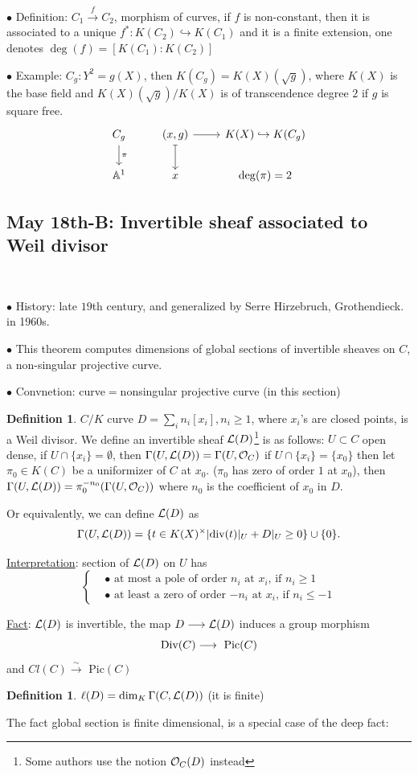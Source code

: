 \documentclass[11pt]{article}
\theoremstyle{definition}
\newtheorem{dfn}[thm]{Definition}
\newcommand{\pic}{\text{ Pic}}
\newcommand{\affn}{\mathbb A}
\newcommand{\call}{{\cal L}}
\newcommand{\calo}{{\cal O}}
\renewcommand{\div}{\textnormal{div}}
\newcommand{\Div}{\textnormal{Div}}
\newcommand{\lrta}{\longrightarrow}
\newcommand{\inj}{\hookrightarrow}
\begin{document}
$\bullet$ Definition: $C_1\overset{f}{\lrta}{C_2}$, morphism of curves, if $f$ is non-constant, then it is associated to a unique $f^*:K(C_2)\inj K(C_1)$ and it is a finite extension, one denotes $\deg(f)=[K(C_1):K(C_2)]$

$\bullet$ Example: $C_g:Y^2=g(X)$, then $K(C_g)=K(X)(\sqrt{g})$, where $K(X)$ is the base field and $K(X)(\sqrt{g})/K(X)$ is of transcendence degree $2$ if $g$ is square free.
$$
\begin{tikzcd}
C_g \arrow[d, "\pi"] & {(x,g)} \arrow[d, maps to] \arrow[r] & K(X)\inj K(C_g) \\
\affn^1 & x & \deg(\pi)=2
\end{tikzcd}
$$
\subsection{May 18th-B: Invertible sheaf associated to Weil divisor}
\ 

$\bullet$ History: late $19$th century, and generalized by Serre Hirzebruch, Grothendieck. in 1960s.

$\bullet$ This theorem computes dimensions of global sections of invertible sheaves on $C$, a non-singular projective curve.

$\bullet$ Convnetion: curve$=$nonsingular projective curve (in this section)
\begin{dfn} $C/K$ curve $D=\sum_i n_i [x_i], n_i\geq 1$, where $x_i$'s are closed points,  is a Weil divisor.  We define an  invertible sheaf $\call(D)$\footnote{Some authors use the notion $\calo_C(D)$ instead} is as follows:
$U\subset C$ open dense, if $U\cap \{x_i\}=\emptyset$, then $\Gamma(U,\call(D))=\Gamma(U,\calo_C)$ if $U\cap \{x_i\}=\{x_0\}$ then let $\pi_0\in K(C)$  be a uniformizer of $C$ at $x_0$.  ($\pi_0$ has zero of order $1$ at $x_0$), then $\Gamma(U,\call(D))=\pi_0^{-n_0}(\Gamma(U,\calo_C))$ where $n_0$ is the coefficient of $x_0$ in $D$.

Or equivalently, we can define $\call(D)$ as
$$
\Gamma(U,\call(D))=\{t\in K(X)^\times| \div(t)|_U+D|_U \geq 0\}\cup \{0\}.
$$
\end{dfn}
\underline{Interpretation}: section of $\call(D)$ on $U$ has 
$$
\left\{
\begin{aligned}
&\bullet\text{ at most a pole of order $n_i$ at $x_i$, if $n_i\geq 1$}\\
&\bullet\text{ at least a zero of order $-n_i$ at $x_i$, if $n_i\leq -1$}
\end{aligned}\right.
$$

\underline{Fact}: $\call(D)$ is invertible, the map $D\lrta\call(D)$ induces a group morphism
$$
\Div(C)\lrta\pic(C)
$$
and $Cl(C)\overset{\sim}{\lrta}\pic(C)$
\begin{dfn}
$\ell(D)=\dim_K\Gamma(C,\call(D))$ (it is finite)
\end{dfn}
The fact global section is finite dimensional, is a special case of the deep fact:
\end{document}
